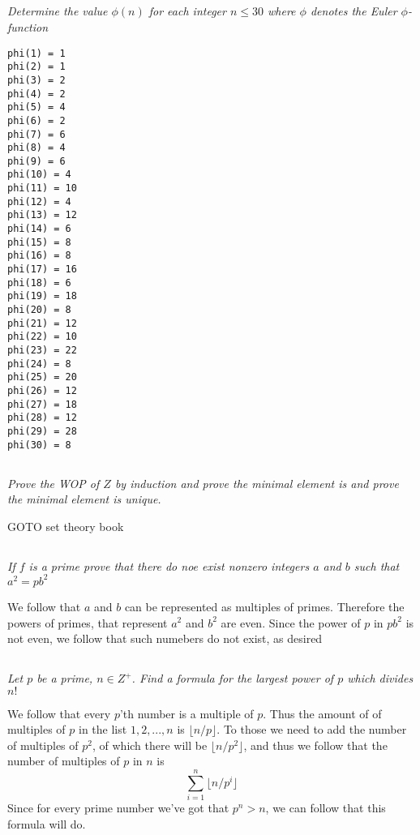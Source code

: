 \documentclass[11pt,oneside,titlepage]{book}
\begin{document}
\subsection{}

\textit{Determine the value $\phi(n)$ for each integer $n \leq 30$ where $\phi$
  denotes the Euler $\phi$-function}

\begin{verbatim}
phi(1) = 1
phi(2) = 1
phi(3) = 2
phi(4) = 2
phi(5) = 4
phi(6) = 2
phi(7) = 6
phi(8) = 4
phi(9) = 6
phi(10) = 4
phi(11) = 10
phi(12) = 4
phi(13) = 12
phi(14) = 6
phi(15) = 8
phi(16) = 8
phi(17) = 16
phi(18) = 6
phi(19) = 18
phi(20) = 8
phi(21) = 12
phi(22) = 10
phi(23) = 22
phi(24) = 8
phi(25) = 20
phi(26) = 12
phi(27) = 18
phi(28) = 12
phi(29) = 28
phi(30) = 8
\end{verbatim}

\subsection{}

\textit{Prove the WOP of $Z$ by induction and prove the minimal element is and prove
  the minimal element is unique.}

GOTO set theory book

\subsection{}

\textit{If $f$ is a prime prove that there do noe exist nonzero integers $a$ and $b$
  such that $a^2 = pb^2$}

We follow that $a$ and $b$ can be represented as multiples of primes. Therefore
the powers of primes, that represent $a^2$ and $b^2$ are even.
Since the power of $p$ in $pb^2$ is not even, we follow that such numebers do not exist,
as desired

\subsection{}

\textit{Let $p$ be a prime, $n \in Z^+$. Find a formula for the largest power of $p$
  which divides $n!$}

We follow that every $p$'th number is a multiple of $p$. Thus the amount of
of multiples of $p$ in the list $1, 2, ..., n$ is $\lfloor n / p \rfloor$.
To those we need to add the number of multiples of $p^2$, of which there will be
$\lfloor n / p^2 \rfloor$, and thus we follow that the number of multiples of $p$ in $n$ is
$$\sum_{i = 1}^n{\lfloor n / p^i\rfloor}$$
Since for every prime  number we've got that $p^n > n$, we can follow that this formula will do.
\end{document}
